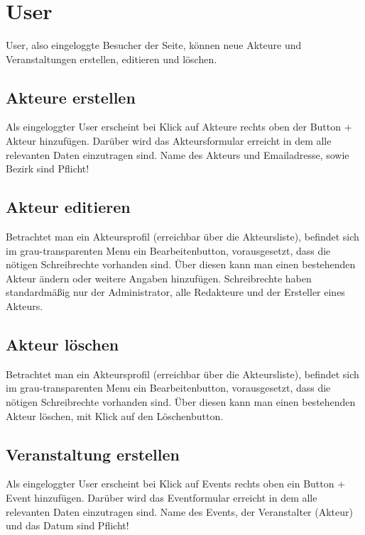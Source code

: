\documentclass{swp}
\begin{document}
\\\\\\\\\\

\tableofcontents
\newpage
\section{User}
User, also eingeloggte Besucher der Seite, k\"onnen neue Akteure und Veranstaltungen erstellen, editieren und l\"oschen.
\subsection{Akteure erstellen}
Als eingeloggter User erscheint bei Klick auf \glqq Akteure\grqq{} rechts oben der Button \glqq + Akteur hinzuf\"ugen\grqq{}. Dar\"uber wird das Akteursformular erreicht in dem alle relevanten Daten einzutragen sind. Name des Akteurs und Emailadresse, sowie Bezirk sind Pflicht!
\subsection{Akteur editieren}
Betrachtet man ein Akteursprofil (erreichbar \"uber die Akteursliste), befindet sich im grau-transparenten Menu ein Bearbeitenbutton, vorausgesetzt, dass die n\"otigen Schreibrechte vorhanden sind. \"Uber diesen kann man einen bestehenden Akteur \"andern oder weitere Angaben hinzuf\"ugen. Schreibrechte haben standardm\"a{\ss}ig nur der Administrator, alle Redakteure und der Ersteller eines Akteurs.
\subsection{Akteur l\"oschen}
Betrachtet man ein Akteursprofil (erreichbar über die Akteursliste), befindet sich im grau-transparenten Menu ein Bearbeitenbutton, vorausgesetzt, dass die n\"otigen Schreibrechte vorhanden sind. \"Uber diesen kann man einen bestehenden Akteur l\"oschen, mit Klick auf den L\"oschenbutton.
\subsection{Veranstaltung erstellen}
Als eingeloggter User erscheint bei Klick auf \glqq Events\grqq{} rechts oben ein Button \glqq + Event hinzuf\"ugen\grqq{}. Dar\"uber wird das Eventformular erreicht in dem alle relevanten Daten einzutragen sind. Name des Events, der Veranstalter (Akteur) und das Datum sind Pflicht!
\end{document}
